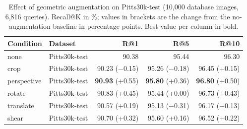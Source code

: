 
\begin{table}[htbp]
\centering
\caption{Effect of geometric augmentation on Pitts30k-test (10,000 database images, 6,816 queries). Recall@K in \%; values in brackets are the change from the no-augmentation baseline in percentage points. Best value per column in bold.}
\label{tab:geoaug_pitts30k_test}
\begin{tabular}{llrrr}
\toprule
Condition & Dataset & R@1 & R@5 & R@10 \\
\midrule
none & Pitts30k-test & 90.38 & 95.44 & 96.30 \\
\midrule
crop & Pitts30k-test & 90.23 {\scriptsize ($-$0.15)} & 95.26 {\scriptsize ($-$0.18)} & 96.45 {\scriptsize (+0.15)} \\
perspective & Pitts30k-test & \textbf{90.93} {\scriptsize (+0.55)} & \textbf{95.80} {\scriptsize (+0.36)} & \textbf{96.80} {\scriptsize (+0.50)} \\
rotate & Pitts30k-test & 90.83 {\scriptsize (+0.45)} & 95.44 {\scriptsize (+0.00)} & 96.73 {\scriptsize (+0.43)} \\
translate & Pitts30k-test & 90.57 {\scriptsize (+0.19)} & 95.13 {\scriptsize ($-$0.31)} & 96.17 {\scriptsize ($-$0.13)} \\
shear & Pitts30k-test & 90.70 {\scriptsize (+0.32)} & 95.60 {\scriptsize (+0.16)} & 96.52 {\scriptsize (+0.22)} \\
\bottomrule
\end{tabular}
\end{table}

